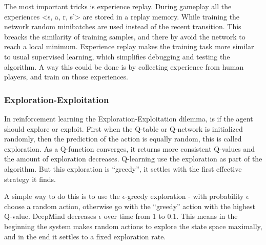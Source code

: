 The most important tricks is experience replay. During gameplay all the experiences <s, a, r, s’> are stored in a replay memory. While training the network random minibatches are used instead of the recent transition. This breacks the similarity of training samples, and there by avoid the network to reach a local minimum. Experience replay makes the training task more similar to usual supervised learning, which simplifies debugging and testing the algorithm. A way this could be done is by collecting experience from human players, and train on those experiences.
  
\subsubsection{Exploration-Exploitation}
In reinforcement learning the Exploration-Exploitation dilemma, is if the agent should explore or exploit. First when the Q-table or Q-network is initialized randomly, then the prediction of the action is equally random, this is called exploration. As a Q-function converges, it returns more consistent Q-values and the amount of exploration decreases. Q-learning use the exploration as part of the algorithm. But this exploration is “greedy”, it settles with the first effective strategy it finds.

A simple way to do this is to use the $\epsilon$-greedy exploration - with probability $\epsilon$ choose a random action, otherwise go with the “greedy” action with the highest Q-value. DeepMind decreases $\epsilon$ over time from 1 to 0.1. This means in the beginning the system makes random actions to explore the state space maximally, and in the end it settles to a fixed exploration rate.  
        